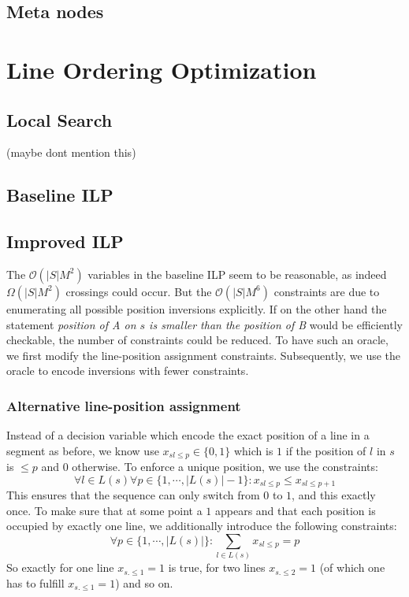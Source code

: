 \documentclass{llncs}
\begin{document}
\subsection{Meta nodes}

%
\section{Line Ordering Optimization}
%




%
\subsection{Local Search}
%
(maybe dont mention this)
%
\subsection{Baseline ILP}
%
%
\subsection{Improved ILP}
%
The $\mathcal{O}(|S|M^{2})$ variables in the baseline ILP seem to be reasonable, as indeed $\Omega(|S|M^{2})$ crossings could occur. But the $\mathcal{O}(|S|M^{6})$ constraints are due to enumerating all possible position inversions explicitly. If on the other hand the statement \emph{position of A on $s$ is smaller than the position of B} would be efficiently checkable, the number of constraints could be reduced. To have such an oracle, we first modify the line-position assignment constraints. Subsequently, we use  the oracle to encode inversions with fewer constraints.
\subsubsection{Alternative line-position assignment}
Instead of a decision variable which encode the exact position of a line in a segment as before, we know use $x_{sl\leq p} \in \{0,1\}$ which is $1$ if the position of $l$ in $s$ is $\leq p$ and $0$ otherwise. To enforce a unique position, we use the constraints:
$$\forall l \in L(s) \forall p \in \{1, \cdots, |L(s)|-1\}: x_{sl\leq p} \leq x_{sl\leq p+1}$$
This ensures that the sequence can only switch from $0$ to $1$, and this exactly once. To make sure that at some point a $1$ appears and that each position is occupied by exactly one line, we additionally introduce the following constraints:
$$\forall p \in \{1, \cdots, |L(s)|\}: \sum_{l \in L(s)} x_{sl\leq p} = p$$
So exactly for  one line $x_{s.\leq 1} =1$ is true, for two lines $x_{s.\leq 2} = 1$ (of which one has to fulfill $x_{s.\leq 1} =1$) and so on.
\end{document}
